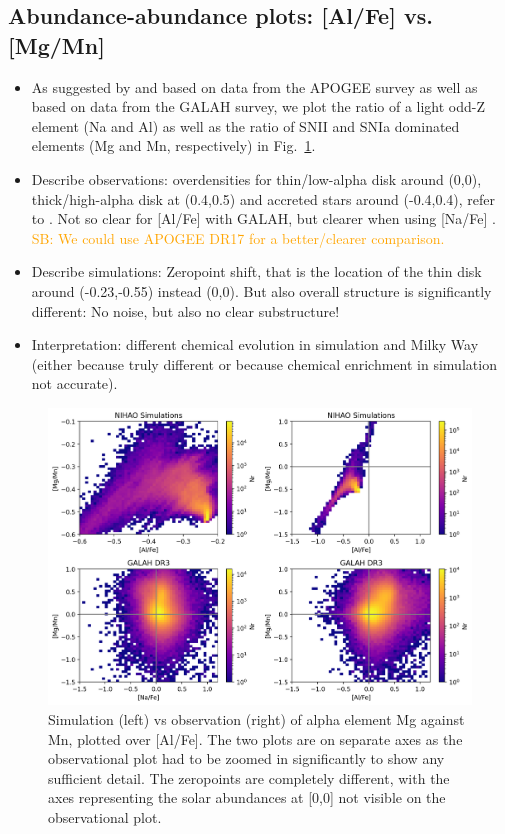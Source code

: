 \documentclass[fleqn,usenatbib]{mnras}
\newcommand{\SB}[1]{{\textcolor{orange}{SB: #1}}}
\begin{document}
\subsection{Abundance-abundance plots: [Al/Fe] vs. [Mg/Mn]} \label{sec:alfe_mgmn}

\begin{itemize}
    \item As suggested by \citet{Hawkins2015} and \citet{Das2020} based on data from the APOGEE survey as well as \citet{Buder2022} based on data from the GALAH survey, we plot the ratio of a light odd-Z element (Na and Al) as well as the ratio of SNII and SNIa dominated elements (Mg and Mn, respectively) in Fig.~\ref{fig:alfe_mgmn}.
    \item Describe observations: overdensities for thin/low-alpha disk around (0,0), thick/high-alpha disk at (0.4,0.5) and accreted stars around (-0.4,0.4), refer to \citet{Das2020, Horta2021}. Not so clear for [Al/Fe] with GALAH, but clearer when using [Na/Fe] \citep{Buder2022}. \SB{We could use APOGEE DR17 for a better/clearer comparison.}
    \item Describe simulations: Zeropoint shift, that is the location of the thin disk around (-0.23,-0.55) instead (0,0). But also overall structure is significantly different: No noise, but also no clear substructure!
    \item Interpretation: different chemical evolution in simulation and Milky Way (either because truly different or because chemical enrichment in simulation not accurate).
\end{itemize}

\begin{figure}
	\includegraphics[width=\textwidth]{figures/plasma_4.png}
    \caption{Simulation (left) vs observation (right) of alpha element Mg against Mn, plotted over [Al/Fe]. The two plots are on separate axes as the observational plot had to be zoomed in significantly to show any sufficient detail. The zeropoints are completely different, with the axes representing the solar abundances at [0,0] not visible on the observational plot. %
    }
    \label{fig:alfe_mgmn}
\end{figure}
\end{document}
